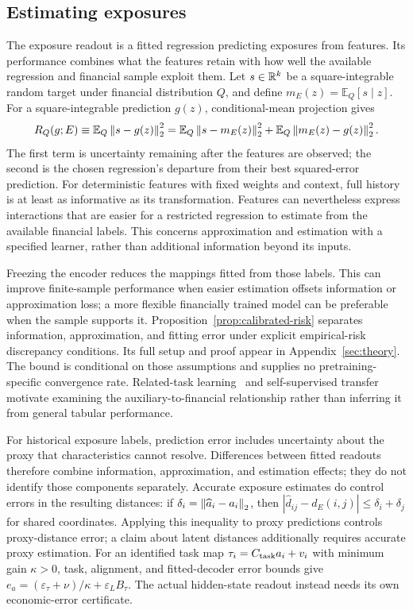 \documentclass[11pt]{article}
\begin{document}
\subsection{Estimating exposures}
The exposure readout is a fitted regression predicting exposures from features.
Its performance combines what the features retain with how well the available
regression and financial sample exploit them. Let $s\in\mathbb{R}^k$ be a
square-integrable random target under financial distribution $Q$, and define
$m_E(z)=\mathbb E_Q[s\mid z]$. For a square-integrable prediction $g(z)$,
conditional-mean projection gives
\begin{equation}\label{eq:readout-split}
  R_Q(g;E)\equiv\mathbb E_Q\left\lVert s-g(z)\right\rVert_2^2
  =\mathbb E_Q\left\lVert s-m_E(z)\right\rVert_2^2
  +\mathbb E_Q\left\lVert m_E(z)-g(z)\right\rVert_2^2.
\end{equation}
The first term is uncertainty remaining after the features are observed; the
second is the chosen regression's departure from their best squared-error
prediction. For deterministic features with fixed weights and
context, full history is at
least as informative as its transformation. Features can nevertheless express
interactions that are easier for a restricted regression to estimate from the
available financial labels. This concerns approximation and estimation with a
specified learner, rather than additional information beyond its inputs.

Freezing the encoder reduces the mappings fitted from those labels. This can
improve finite-sample performance when easier estimation offsets information or
approximation loss; a more flexible financially trained model can be preferable
when the sample supports it. Proposition~\ref{prop:calibrated-risk} separates
information, approximation, and fitting error under explicit empirical-risk
discrepancy conditions. Its full setup and proof appear in
Appendix~\ref{sec:theory}. The bound is conditional on those assumptions and
supplies no pretraining-specific convergence rate. Related-task
learning~\cite{baxter2000,maurer2016} and self-supervised
transfer~\cite{lee2021} motivate
examining the auxiliary-to-financial relationship rather than inferring it
from general tabular performance.

For historical exposure labels, prediction error includes uncertainty about the
proxy that characteristics cannot resolve. Differences between fitted readouts
therefore combine information, approximation, and estimation effects; they do
not identify those components separately. Accurate exposure estimates do control
errors in the resulting distances: if
$\delta_i=\left\lVert\widehat a_i-a_i\right\rVert_2$, then
$|\widehat d_{ij}-d_E(i,j)|\le\delta_i+\delta_j$ for shared coordinates.
Applying this inequality to proxy predictions controls proxy-distance error;
a claim about latent distances additionally requires accurate proxy estimation.
For an identified task map $\tau_i=C_{\rm task}a_i+v_i$ with minimum gain
$\kappa>0$, task, alignment, and fitted-decoder error bounds give
$e_a=(\varepsilon_\tau+\nu)/\kappa+\varepsilon_L B_\tau$.
The actual hidden-state readout instead needs its own economic-error
certificate.
\end{document}
